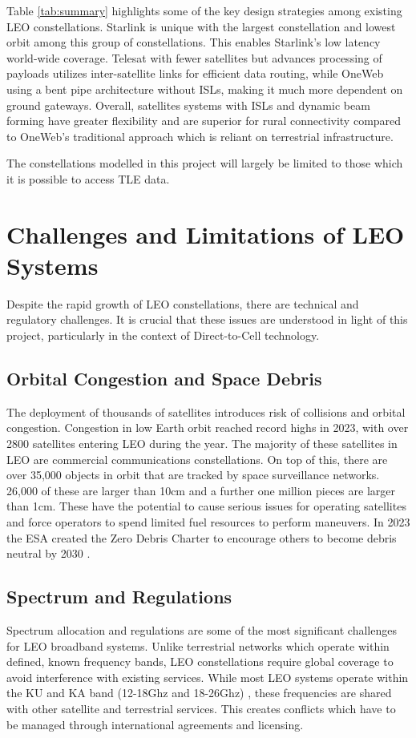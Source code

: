 Table \ref{tab:summary} highlights some of the key design strategies among existing LEO constellations. Starlink is unique with the largest constellation and lowest orbit among this group of constellations. This enables Starlink's low latency world-wide coverage. Telesat with fewer satellites but advances processing of payloads utilizes inter-satellite links for efficient data routing, while OneWeb using a bent pipe architecture without ISLs, making it much more dependent on ground gateways. Overall, satellites systems with ISLs and dynamic beam forming have greater flexibility and are superior for rural connectivity compared to OneWeb's traditional approach which is reliant on terrestrial infrastructure. 

The constellations modelled in this project will largely be limited to those which it is possible to access TLE data.

\section{Challenges and Limitations of LEO Systems}
Despite the rapid growth of LEO constellations, there are technical and regulatory challenges. It is crucial that these issues are understood in light of this project, particularly in the context of Direct-to-Cell technology.
\subsection{Orbital Congestion and Space Debris}
The deployment of thousands of satellites introduces risk of collisions and orbital congestion. Congestion in low Earth orbit reached record highs in 2023, with over 2800 satellites entering LEO during the year. The majority of these satellites in LEO are commercial communications constellations. On top of this, there are over 35,000 objects in orbit that are tracked by space surveillance networks. 26,000 of these are larger than 10cm and a further one million pieces are larger than 1cm. These have the potential to cause serious issues for operating satellites and force operators to spend limited fuel resources to perform maneuvers. In 2023 the ESA created the Zero Debris Charter to encourage others to become debris neutral by 2030 \cite{payloadspace2024_debris}.

\subsection{Spectrum and Regulations}
Spectrum allocation and regulations are some of the most significant challenges for LEO broadband systems. Unlike terrestrial networks which operate within defined, known frequency bands, LEO constellations require global coverage to avoid interference with existing services. While most LEO systems operate within the KU and KA band (12-18Ghz and 18-26Ghz) \cite{esa_satellite_frequency_bands}, these frequencies are shared with other satellite and terrestrial services. This creates conflicts which have to be managed through international agreements and licensing. 

